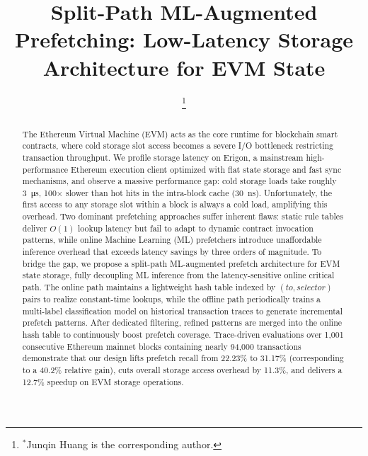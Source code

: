 \documentclass[conference]{IEEEtran}
\begin{document}
\title{Split-Path ML-Augmented Prefetching: Low-Latency Storage Architecture for EVM State}

\author{
\thanks{$^{*}$Junqin Huang is the corresponding author.}
}

\maketitle

\begin{abstract}
The Ethereum Virtual Machine (EVM) acts as the core runtime for blockchain smart contracts, where cold storage slot access becomes a severe I/O bottleneck restricting transaction throughput. We profile storage latency on Erigon, a mainstream high-performance Ethereum execution client optimized with flat state storage and fast sync mechanisms, and observe a massive performance gap: cold storage loads take roughly \qty{3}{\micro\second}, 100$\times$ slower than hot hits in the intra-block cache (\qty{30}{\nano\second}). Unfortunately, the first access to any storage slot within a block is always a cold load, amplifying this overhead. Two dominant prefetching approaches suffer inherent flaws: static rule tables deliver $O(1)$ lookup latency but fail to adapt to dynamic contract invocation patterns, while online Machine Learning (ML) prefetchers introduce unaffordable inference overhead that exceeds latency savings by three orders of magnitude.
To bridge the gap, we propose a split-path ML-augmented prefetch architecture for EVM state storage, fully decoupling ML inference from the latency-sensitive online critical path. The online path maintains a lightweight hash table indexed by $(to, selector)$ pairs to realize constant-time lookups, while the offline path periodically trains a multi-label classification model on historical transaction traces to generate incremental prefetch patterns. After dedicated filtering, refined patterns are merged into the online hash table to continuously boost prefetch coverage. 
Trace-driven evaluations over 1,001 consecutive Ethereum mainnet blocks containing nearly 94,000 transactions demonstrate that our design lifts prefetch recall from 22.23\% to 31.17\% (corresponding to a 40.2\% relative gain), cuts overall storage access overhead by 11.3\%, and delivers a 12.7\% speedup on EVM storage operations.
\end{abstract}
\end{document}
